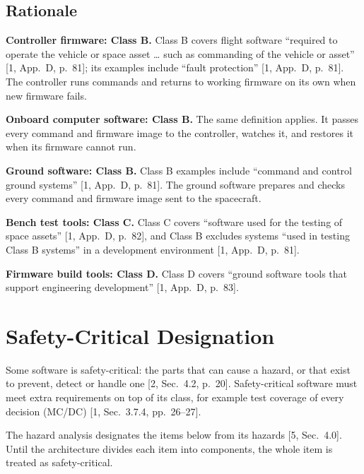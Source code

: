 \documentclass[11pt,a4paper]{article}
\begin{document}
\subsection{Rationale}
\noindent\textbf{Controller firmware: Class B.} Class B covers flight software
  ``required to operate the vehicle or space asset \ldots{} such as commanding
  of the vehicle or asset'' [1, App.~D, p.~81]; its examples include ``fault
  protection'' [1, App.~D, p.~81]. The controller runs commands and returns to
  working firmware on its own when new firmware fails.\par\smallskip
\noindent\textbf{Onboard computer software: Class B.} The same definition applies. It
  passes every command and firmware image to the controller, watches it, and
  restores it when its firmware cannot run.\par\smallskip
\noindent\textbf{Ground software: Class B.} Class B examples include ``command and control
  ground systems'' [1, App.~D, p.~81]. The ground software prepares and checks
  every command and firmware image sent to the spacecraft.\par\smallskip
\noindent\textbf{Bench test tools: Class C.} Class C covers ``software used for the testing
  of space assets'' [1, App.~D, p.~82], and Class B excludes systems ``used in
  testing Class B systems'' in a development environment [1, App.~D, p.~81].\par\smallskip
\noindent\textbf{Firmware build tools: Class D.} Class D covers ``ground software tools that
  support engineering development'' [1, App.~D, p.~83].\par\smallskip

\section{Safety-Critical Designation}
Some software is safety-critical: the parts that can cause a hazard, or that
exist to prevent, detect or handle one [2, Sec.~4.2, p.~20]. Safety-critical
software must meet extra requirements on top of its class, for example test
coverage of every decision (MC/DC) [1, Sec.~3.7.4, pp.~26--27].

The hazard analysis designates the items below from its hazards [5, Sec.~4.0]. Until the architecture
divides each item into components, the whole item is treated as
safety-critical.
\end{document}
